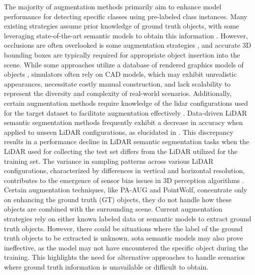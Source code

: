 The majority of augmentation methods primarily aim to enhance model performance for detecting specific classes using pre-labeled class instances. Many existing strategies assume prior knowledge of ground truth objects, with some leveraging state-of-the-art semantic models to obtain this information \parencite{rs_aug_2023}. However, occlusions are often overlooked is some augmentation strategies \parencite{second2018, xiao2022polarmix}, and accurate 3D bounding boxes are typically required for appropriate object insertion into the scene. While some approaches utilize a database of rendered graphics models of objects \parencite{second2018, rs_aug_2023}, simulators often rely on CAD models, which may exhibit unrealistic appearances, necessitate costly manual construction, and lack scalability to represent the diversity and complexity of real-world scenarios. Additionally, certain augmentation methods require knowledge of the lidar configurations used for the target dataset to facilitate augmentation effectively \parencite{9811816, dada_2023}. 
Data-driven LiDAR semantic segmentation methods frequently exhibit a decrease in accuracy when applied to unseen LiDAR configurations, as elucidated in \parencite{10204248}. This discrepancy results in a performance decline in LiDAR semantic segmentation tasks when the LiDAR used for collecting the test set differs from the LiDAR utilized for the training set. The variance in sampling patterns across various LiDAR configurations, characterized by differences in vertical and horizontal resolution, contributes to the emergence of sensor bias issues in 3D perception algorithms \parencite{survery_domain_adp_2021, domain_adp_appr_2020}. 
Certain augmentation techniques, like PA-AUG and PointWolf, concentrate only on enhancing the ground truth (GT) objects, they do not handle how these objects are combined with the surrounding scene. 
Current augmentation strategies rely on either known labeled data or semantic models to extract ground truth objects. However, there could be situations where the label of the ground truth objects to be extracted is unknown. \acrshort{sota} semantic models may also prove ineffective, as the model may not have encountered the specific object during the training. This highlights the need for alternative approaches to handle scenarios where ground truth information is unavailable or difficult to obtain.

